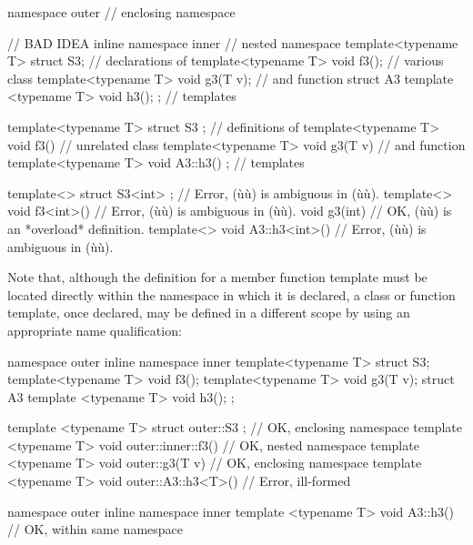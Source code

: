 \begin{emcppslisting}[emcppsbatch=e8]
namespace outer                                          // enclosing namespace
{                                                        // BAD IDEA
    inline namespace inner                               // nested namespace
    {
        template<typename T> struct S3;                  // declarations of
        template<typename T> void f3();                  // various class
        template<typename T> void g3(T v);               // and function
        struct A3 { template <typename T> void h3(); };  // templates
    }

    template<typename T> struct S3 { };                  // definitions of
    template<typename T> void f3() { }                   // unrelated class
    template<typename T> void g3(T v) { }                // and function
    template<typename T> void A3::h3() { };              // templates

    template<> struct S3<int> { };     // Error, (ù{}ù) is ambiguous in (ù{}ù).
    template<> void f3<int>() { }      // Error, (ù{}ù) is ambiguous in (ù{}ù).
    void g3(int) { }                   // OK, (ù{}ù) is an *overload* definition.
    template<> void A3::h3<int>() { }  // Error, (ù{}ù) is ambiguous in (ù{}ù).
}
\end{emcppslisting}
    
\noindent Note that, although the definition for a member function template must
be located directly within the namespace in which it is declared, a
class or function template, once declared, may be defined in a different
scope by using an appropriate name qualification:

\begin{emcppshiddenlisting}[emcppsbatch=e9]
namespace outer
{
    inline namespace inner
    {
        template<typename T> struct S3;
        template<typename T> void f3();
        template<typename T> void g3(T v);
        struct A3 { template <typename T> void h3(); };
    }
}
\end{emcppshiddenlisting}
\begin{emcppslisting}[emcppsbatch=e9]
template <typename T> struct outer::S3 { };        // OK, enclosing namespace
template <typename T> void outer::inner::f3() { }  // OK, nested namespace
template <typename T> void outer::g3(T v) { }      // OK, enclosing namespace
template <typename T> void outer::A3::h3<T>() { }  // Error, ill-formed

namespace outer
{
    inline namespace inner
    {
        template <typename T> void A3::h3() { }    // OK, within same namespace
    }
}
\end{emcppslisting}
    
